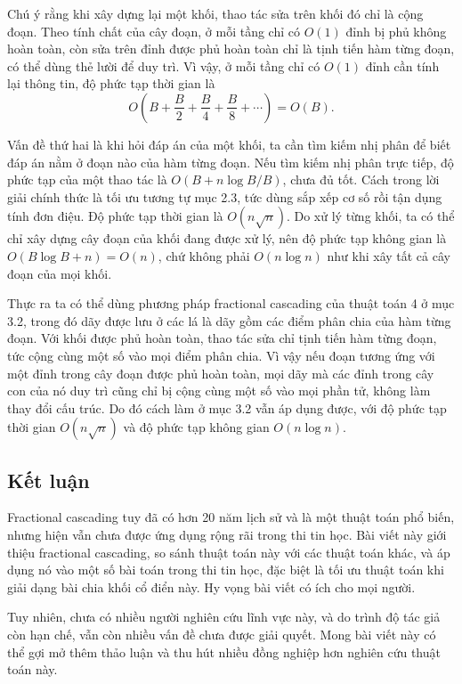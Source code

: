 \documentclass[11pt]{article}
\begin{document}
Chú ý rằng khi xây dựng lại một khối, thao tác sửa trên khối đó chỉ là cộng
đoạn. Theo tính chất của cây đoạn, ở mỗi tầng chỉ có $O(1)$ đỉnh bị phủ không
hoàn toàn, còn sửa trên đỉnh được phủ hoàn toàn chỉ là tịnh tiến hàm từng đoạn,
có thể dùng thẻ lười để duy trì. Vì vậy, ở mỗi tầng chỉ có $O(1)$ đỉnh cần
tính lại thông tin, độ phức tạp thời gian là
\[
O\left(B+\frac{B}{2}+\frac{B}{4}+\frac{B}{8}+\cdots\right)=O(B).
\]

Vấn đề thứ hai là khi hỏi đáp án của một khối, ta cần tìm kiếm nhị phân để biết
đáp án nằm ở đoạn nào của hàm từng đoạn. Nếu tìm kiếm nhị phân trực tiếp, độ
phức tạp của một thao tác là $O(B+n\log B/B)$, chưa đủ tốt. Cách trong lời giải
chính thức là tối ưu tương tự mục 2.3, tức dùng sắp xếp cơ số rồi tận dụng tính
đơn điệu. Độ phức tạp thời gian là $O(n\sqrt n)$. Do xử lý từng khối, ta có
thể chỉ xây dựng cây đoạn của khối đang được xử lý, nên độ phức tạp không gian
là $O(B\log B+n)=O(n)$, chứ không phải $O(n\log n)$ như khi xây tất cả cây đoạn
của mọi khối.

Thực ra ta có thể dùng phương pháp fractional cascading của thuật toán 4 ở mục
3.2, trong đó dãy được lưu ở các lá là dãy gồm các điểm phân chia của hàm từng
đoạn. Với khối được phủ hoàn toàn, thao tác sửa chỉ tịnh tiến hàm từng đoạn,
tức cộng cùng một số vào mọi điểm phân chia. Vì vậy nếu đoạn tương ứng với một
đỉnh trong cây đoạn được phủ hoàn toàn, mọi dãy mà các đỉnh trong cây con của
nó duy trì cũng chỉ bị cộng cùng một số vào mọi phần tử, không làm thay đổi cấu
trúc. Do đó cách làm ở mục 3.2 vẫn áp dụng được, với độ phức tạp thời gian
$O(n\sqrt n)$ và độ phức tạp không gian $O(n\log n)$.

\subsection{Kết luận}

Fractional cascading tuy đã có hơn 20 năm lịch sử và là một thuật toán phổ
biến, nhưng hiện vẫn chưa được ứng dụng rộng rãi trong thi tin học. Bài viết
này giới thiệu fractional cascading, so sánh thuật toán này với các thuật toán
khác, và áp dụng nó vào một số bài toán trong thi tin học, đặc biệt là tối ưu
thuật toán khi giải dạng bài chia khối cổ điển này. Hy vọng bài viết có ích
cho mọi người.

Tuy nhiên, chưa có nhiều người nghiên cứu lĩnh vực này, và do trình độ tác giả
còn hạn chế, vẫn còn nhiều vấn đề chưa được giải quyết. Mong bài viết này có
thể gợi mở thêm thảo luận và thu hút nhiều đồng nghiệp hơn nghiên cứu thuật
toán này.
\end{document}
